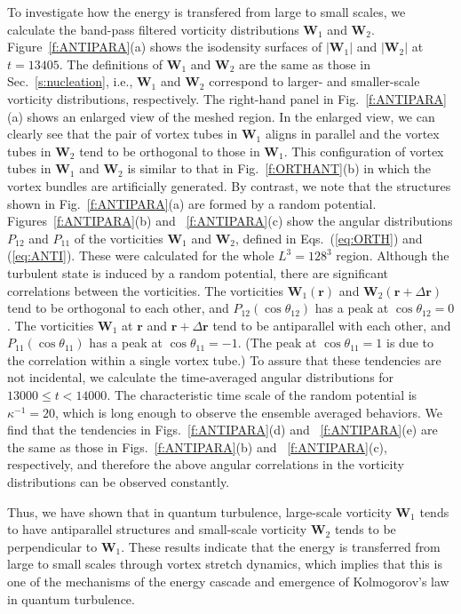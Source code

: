 \documentclass[aps,onecolumn,pra,longbibliography]{revtex4}
\begin{document}
	To investigate how the energy is transfered from large to small scales,
	we calculate the band-pass filtered vorticity distributions $\bm{W}_1$ and $\bm{W}_2$.
	Figure~\ref{f:ANTIPARA}(a) shows
	the isodensity surfaces of
	$|\bm{W}_1|$ and $|\bm{W}_2|$ at $t=13405$.
	The definitions of $\bm{W}_1$ and $\bm{W}_2$
	are the same as those in Sec.~\ref{s:nucleation}, i.e.,
	$\bm{W}_1$ and $\bm{W}_2$ correspond to larger- and smaller-scale vorticity
	distributions, respectively.
	The right-hand panel in Fig.~\ref{f:ANTIPARA}(a) shows
	an enlarged view of the meshed region.
	In the enlarged view, we can clearly see that
	the pair of vortex tubes in $\bm{W}_1$ aligns in parallel
	and the vortex tubes in $\bm{W}_2$ tend to be orthogonal to those in $\bm{W}_1$.
	This configuration of vortex tubes in $\bm{W}_1$ and $\bm{W}_2$ is
	similar to that in Fig.~\ref{f:ORTHANT}(b) in which the vortex bundles are artificially generated.
	By contrast, we note that the structures shown in Fig.~\ref{f:ANTIPARA}(a) are formed by a random potential.
	Figures~\ref{f:ANTIPARA}(b) and ~\ref{f:ANTIPARA}(c) show
	the angular distributions $P_{12}$ and $P_{11}$
	of the vorticities $\bm{W}_1$ and $\bm{W}_2$,
	defined in Eqs.~(\ref{eq:ORTH}) and (\ref{eq:ANTI}).
	These were calculated for the whole $L^3=128^3$ region.
	Although the turbulent state is induced by a random potential,
	there are significant correlations between the vorticities.
	The vorticities $\bm{W}_1(\bm{r})$ and
	$\bm{W}_2(\bm{r} + \Delta \bm{r})$ tend to be orthogonal to each other,
	and $P_{12}(\cos \theta_{12})$ has a peak at $\cos \theta_{12} = 0$.
	The vorticities $\bm{W}_1$ at $\bm{r}$ and $\bm{r} + \Delta \bm{r}$
	tend to be antiparallel with each other, and $P_{11}(\cos \theta_{11})$
	has a peak at $\cos \theta_{11} = -1$.
	(The peak at $\cos\theta_{11}=1$ is due to the correlation within
	a single vortex tube.)
	To assure that these tendencies are not incidental,
	we calculate the time-averaged angular distributions for $13000 \leq t < 14000$.
	The characteristic time scale of the random potential is $\kappa^{-1} = 20$,
	which is long enough to observe the ensemble averaged behaviors.
	We find that the tendencies in Figs.~\ref{f:ANTIPARA}(d) and
	~\ref{f:ANTIPARA}(e) are the same as those in Figs.~\ref{f:ANTIPARA}(b)
	and ~\ref{f:ANTIPARA}(c), respectively, and therefore the above angular correlations
	in the vorticity distributions can be observed constantly.


	Thus, we have shown that in quantum turbulence, large-scale vorticity
	$\bm{W}_1$ tends to have antiparallel structures
	and small-scale vorticity $\bm{W}_2$ tends to be perpendicular to $\bm{W}_1$.
	These results indicate that the energy is transferred from large to small scales
	through vortex stretch dynamics,
	which implies that this is one of the mechanisms of the energy cascade
	and emergence of Kolmogorov's law in quantum turbulence.
\end{document}
